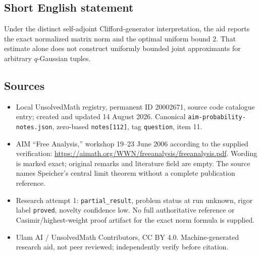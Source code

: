 \documentclass[11pt]{article}
\begin{document}
\subsection{Short English statement}
Under the distinct self-adjoint Clifford-generator interpretation, the aid reports the exact normalized matrix norm and the optimal uniform bound $2$. That estimate alone does not construct uniformly bounded joint approximants for arbitrary $q$-Gaussian tuples.
\subsection{Sources}
\begin{itemize}
\item Local UnsolvedMath registry, permanent ID 20002671, source code catalogue entry; created and updated 14 August 2026. Canonical \texttt{aim-probability-notes.json}, zero-based \texttt{notes[112]}, tag \texttt{question}, item 11.
\item AIM ``Free Analysis,'' workshop 19--23 June 2006 according to the supplied verification: \url{https://aimath.org/WWN/freeanalysis/freeanalysis.pdf}. Wording is marked exact; original remarks and literature field are empty. The source names Speicher's central limit theorem without a complete publication reference.
\item Research attempt 1: \texttt{partial\_result}, problem status at run unknown, rigor label \texttt{proved}, novelty confidence low. No full authoritative reference or Casimir/highest-weight proof artifact for the exact norm formula is supplied.
\item Ulam AI / UnsolvedMath Contributors, CC BY 4.0. Machine-generated research aid, not peer reviewed; independently verify before citation.
\end{itemize}
\end{document}
